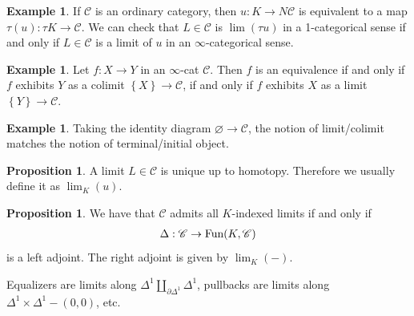 \documentclass[12pt]{amsart}
\theoremstyle{definition}
\newtheorem{example}[theorem]{Example}
\newtheorem{proposition}[theorem]{Proposition}
\let\del\partial
\let\emptyset\varnothing
\begin{document}
\begin{example} If $\mathscr{C}$ is an ordinary category, then $u: K \to N\mathscr{C}$ is equivalent to a map $\tau(u): \tau K \to \mathscr{C}$. We can check that $L\in \mathscr{C}$ is $\lim(\tau u)$ in a 1-categorical sense if and only if $L\in \mathscr{C}$ is a limit of $u$ in an $\infty$-categorical sense.
\end{example}

\begin{example} Let $f: X \to Y$ in an $\infty$-cat $\mathscr{C}$. Then $f$ is an equivalence if and only if $f$ exhibits $Y$ as a colimit $\left\{ X \right\} \to \mathscr{C}$, if and only if $f$ exhibits $X$ as a limit $\left\{ Y \right\}\to \mathscr{C}$.
\end{example}

\begin{example} Taking the identity diagram $\emptyset \to \mathscr{C}$, the notion of limit/colimit matches the notion of terminal/initial object.
\end{example}

\begin{proposition} A limit $L\in \mathscr{C}$ is unique up to homotopy. Therefore we usually define it as $\lim_K(u)$.
\end{proposition}

\begin{proposition} We have that $\mathscr{C}$ admits all $K$-indexed limits if and only if
\begin{align*}
    \Delta: \mathscr{C} \to \text{Fun}(K,\mathscr{C})
\end{align*}
is a left adjoint. The right adjoint is given by $\lim_K(-)$.
\end{proposition}

Equalizers are limits along $\Delta^1 \amalg_{\del\Delta^1}\Delta^1$, pullbacks are limits along $\Delta^1 \times \Delta^1 - (0,0)$, etc.



\newpage

{}
\end{document}
